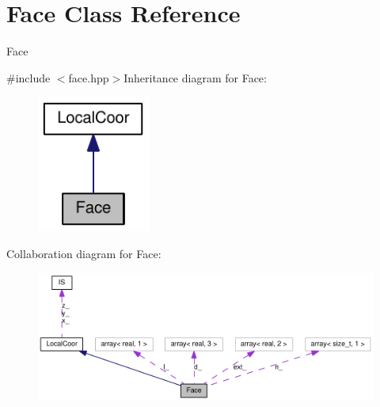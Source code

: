 \hypertarget{classFace}{
\section{Face Class Reference}
\label{classFace}
}


Face  


{\ttfamily \#include $<$face.hpp$>$}Inheritance diagram for Face:\nopagebreak
\begin{figure}[H]
\begin{center}
\leavevmode
\includegraphics[width=105pt]{classFace__inherit__graph}
\end{center}
\end{figure}
Collaboration diagram for Face:\nopagebreak
\begin{figure}[H]
\begin{center}
\leavevmode
\includegraphics[width=400pt]{classFace__coll__graph}
\end{center}
\end{figure}
